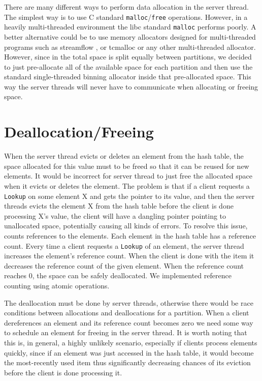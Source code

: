There are many different ways to perform data allocation in the server thread. The simplest way is to use C standard 
\texttt{malloc}/\texttt{free} operations. However, in a heavily multi-threaded environment the libc standard \texttt{malloc} performs poorly. 
A better alternative could be to use memory allocators designed for multi-threaded programs such as streamflow \cite{streamflow}, 
or tcmalloc \cite{tcmalloc} or any other multi-threaded allocator. However, since in \cphash{} the total space is split equally 
between partitions, we decided to just pre-allocate all of the available space for each partition and then use the standard
single-threaded binning allocator \cite{binallocator} inside that pre-allocated space. This way the server threads will never have to communicate when 
allocating or freeing space. 

\section{Deallocation/Freeing}

When the server thread evicts or deletes an element from the hash table, the space allocated for this value must to be 
freed so that it can be reused for new elements. It would be incorrect for server thread to just free the allocated space when it evicts or deletes 
the element. The problem is that if a client requests a \texttt{Lookup} on some element X and gets the pointer to its value, 
and then the server threads evicts the element X from the hash table before the client is done processing X's value, the client will have a dangling 
pointer pointing to unallocated space, potentially causing all kinds of errors. To resolve this issue, \cphash{} counts references to the elements. 
Each element in the hash table has a reference count. Every time a client requests a \texttt{Lookup} of an element, the server thread increases the element's 
reference count. When the client is done with the item it decreases the reference count of the given element. When the reference count reaches 0, 
the space can be safely deallocated. We implemented reference counting using atomic operations.

The deallocation must be done by server threads, otherwise there would be race conditions between allocations 
and deallocations for a partition. When a client dereferences an element and its reference count becomes zero we need 
some way to schedule an element for freeing in the server thread. It is worth noting that this is, in general, a highly unlikely 
scenario, especially if clients process elements quickly, since if an element was just accessed in the hash table, it 
would become the most-recently used item thus significantly decreasing chances of its eviction before the client is done processing it.

